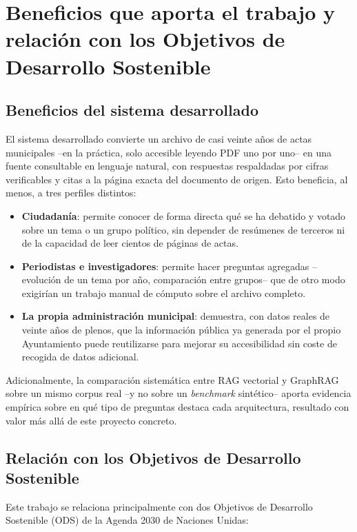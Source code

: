 \chapter{Beneficios que aporta el trabajo y relación con los Objetivos de Desarrollo Sostenible}
\label{ch:beneficios}

\section{Beneficios del sistema desarrollado}

El sistema desarrollado convierte un archivo de casi veinte años de actas
municipales --en la práctica, solo accesible leyendo PDF uno por uno-- en una
fuente consultable en lenguaje natural, con respuestas respaldadas por cifras
verificables y citas a la página exacta del documento de origen. Esto beneficia,
al menos, a tres perfiles distintos:

\begin{itemize}
	\item \textbf{Ciudadanía}: permite conocer de forma directa qué se ha
	debatido y votado sobre un tema o un grupo político, sin depender de
	resúmenes de terceros ni de la capacidad de leer cientos de páginas de actas.
	\item \textbf{Periodistas e investigadores}: permite hacer preguntas
	agregadas --evolución de un tema por año, comparación entre grupos-- que de
	otro modo exigirían un trabajo manual de cómputo sobre el archivo completo.
	\item \textbf{La propia administración municipal}: demuestra, con datos
	reales de veinte años de plenos, que la información pública ya generada por
	el propio Ayuntamiento puede reutilizarse para mejorar su accesibilidad sin
	coste de recogida de datos adicional.
\end{itemize}

Adicionalmente, la comparación sistemática entre RAG vectorial y GraphRAG sobre
un mismo corpus real --y no sobre un \textit{benchmark} sintético-- aporta
evidencia empírica sobre en qué tipo de preguntas destaca cada arquitectura,
resultado con valor más allá de este proyecto concreto.

\section{Relación con los Objetivos de Desarrollo Sostenible}

Este trabajo se relaciona principalmente con dos Objetivos de Desarrollo
Sostenible (ODS) de la Agenda 2030 de Naciones Unidas:

